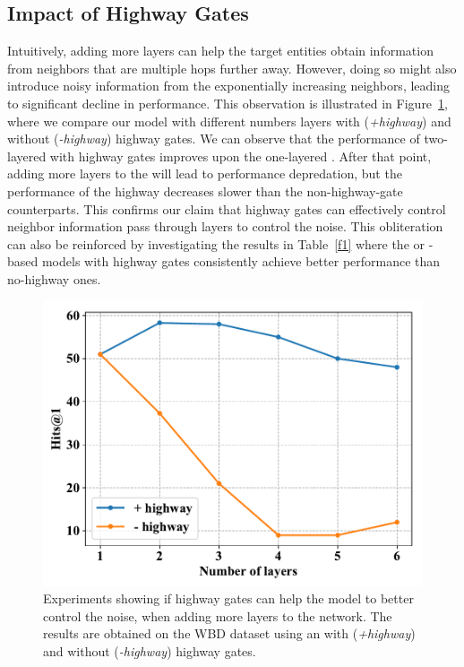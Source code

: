 \subsection{Impact of Highway Gates} Intuitively, adding more \HRGCN layers can help the target entities obtain information from neighbors that are multiple hops
further away. However, doing so might also introduce noisy information from the exponentially increasing neighbors, leading to significant
decline in performance. This observation is illustrated in Figure~\ref{highway}, where we compare our model with different numbers layers
with (\emph{+highway}) and without (\emph{-highway}) highway gates. We can observe that the performance of two-layered \RGCNs with highway
gates improves upon the one-layered \RGCN. After that point, adding more layers to the \RGCN will lead to performance depredation, but the
performance of the highway \RGCNs decreases slower than the non-highway-gate counterparts. This confirms our claim that highway gates can
effectively control neighbor information pass through \RGCN layers to control the noise. This obliteration can also be reinforced by
investigating the results in Table~\ref{f1} where the \GCN or \RGCN-based models with highway gates consistently achieve better performance
than no-highway ones.
\begin{figure}[t!]
	\centering
	\includegraphics[width=0.85\linewidth]{figures/graph3.pdf}
	\caption{Experiments showing if highway gates can help the \RGCN model to better control the noise, when adding more \RGCN layers to the network. The results are
obtained on the WBD dataset using an \RGCN with (\emph{+highway}) and without (\emph{-highway}) highway gates.}	
\label{highway}
\end{figure}
